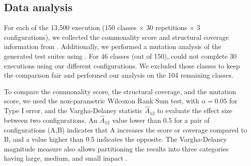 \subsection{Data analysis}

For each of the 13,500 execution (150 classes $\times$ 30 repetitions $\times$ 3 configurations), we collected the commonality score and structural coverage information from \evosuite. Additionally, we performed a mutation analysis of the generated test suites using \pit \cite{Coles2016a}. 
For 46 classes (out of 150), \evosuite could not complete 30 executions using our different configurations. We excluded those classes to keep the comparison fair and performed our analysis on the 104 remaining classes. 

To compare the commonality score, the structural coverage, and the mutation score, we used the non-parametric Wilcoxon Rank Sum test, with $\alpha = 0.05$ for Type I error, and the Vargha-Delaney statistic $\widehat{A}_{12}$ \cite{Vargha2000} to evaluate the effect size between two configurations. An $\widehat{A}_{12}$ value lower than 0.5 for a pair of configurations (A,B) indicates that A increases the score or coverage compared to B, and a value higher than 0.5 indicates the opposite. The Vargha-Delaney magnitude measure also allows partitioning the results into three categories having large, medium, and small impact \cite{Vargha2000}.

